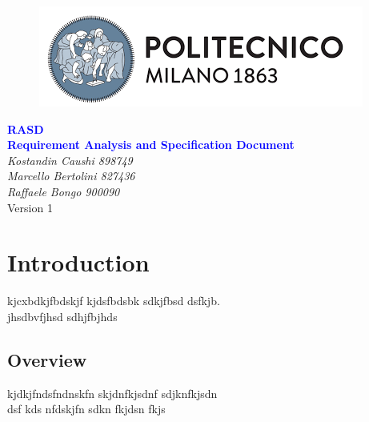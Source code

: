 


	
	\begin{titlepage}
		\centering
		\begin{figure}
			\vspace*{0mm}
			\centering
			\includegraphics[scale=0.7]{Images/PolimiLogo}
			\\[3cm]
		\end{figure}		
		\vspace{65mm}
		\textcolor{Blue}{\textbf{\Huge RASD}}\\[4mm]
		{\textcolor{Blue}{\textbf{\Large{Requirement Analysis and Specification Document}}}}\\
		\vspace{30mm}
		\textit{\large Kostandin Caushi 898749}\\[3mm]
		\textit{\large Marcello Bertolini 827436}\\[3mm]
		\textit{\large Raffaele Bongo 900090}\\[3mm]
		\vspace{60mm}
		Version 1
	\end{titlepage}

	\vspace*{0mm}
	\tableofcontents
	\newpage
	
	\vspace*{0mm}
	\section{Introduction}
	kjcxbdkjfbdskjf kjdsfbdsbk sdkjfbsd dsfkjb.\\
	jhsdbvfjhsd sdhjfbjhds
	\subsection{Overview}
	kjdkjfndsfndnskfn skjdnfkjsdnf sdjknfkjsdn\\
	dsf kds nfdskjfn sdkn fkjdsn fkjs

